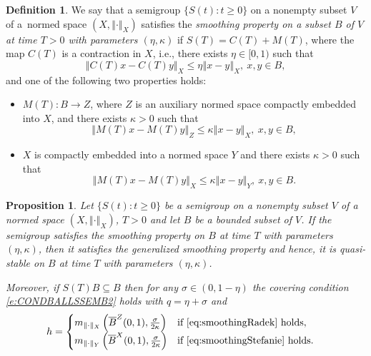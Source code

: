 \documentclass[a4paper,12pt,reqno]{amsart}
\theoremstyle{plain}
\newtheorem{prop}[lem]{Proposition}
\theoremstyle{definition}
\newtheorem{defn}[lem]{Definition}
\numberwithin{equation}{section}
\newcommand{\norm}[1]{\left\Vert#1\right\Vert}
\renewcommand{\geq}{\geqslant}
\renewcommand{\leq}{\leqslant}
\begin{document}
\begin{defn}\label{defn:smooth}
We say that a semigroup $\{S(t)\colon t\geq0\}$ on a nonempty subset $V$ of a~normed space $(X,\norm{\cdot}_{X})$
satisfies the \textit{smoothing property on a subset $B$ of $V$ at time $T>0$ with parameters $(\eta,\kappa)$} if $S(T)=C(T)+M(T)$, where 
the map $C(T)$ is a contraction in $X$, i.e., there exists $\eta\in [0,1)$ such that
\begin{equation}\label{eq:contraction}
\norm{C(T)x-C(T)y}_{X}\leq \eta\norm{x-y}_{X},\ x,y\in B,
\end{equation}
and one of the following two properties holds:
\begin{itemize}
\item[(i)] 
$M(T)\colon B\to Z$, where $Z$ is an auxiliary normed space compactly embedded into $X$, and there exists $\kappa>0$ such that 
\begin{equation}\label{eq:smoothingRadek}
\norm{M(T)x-M(T)y}_{Z}\leq \kappa\norm{x-y}_{X},\ x,y\in B,
\end{equation} 
\item[(ii)] 
$X$ is compactly embedded into a normed space $Y$ and there exists $\kappa>0$  such that 
 \begin{equation}\label{eq:smoothingStefanie}
\norm{M(T)x-M(T)y}_{X}\leq \kappa\norm{x-y}_{Y},\ x,y\in B.
\end{equation} 
\end{itemize}
\end{defn}

\begin{prop}\label{prop:smoothqs}
Let $\{S(t)\colon t\geq 0\}$ be a semigroup on a nonempty subset $V$ of a normed space $(X,\norm{\cdot}_{X})$, $T>0$ 
and let $B$ be a bounded subset of $V$.
If the semigroup satisfies the smoothing property on $B$ at time $T$ with parameters $(\eta,\kappa)$, then it satisfies the generalized smoothing property and hence, it is quasi-stable on $B$ at time $T$ with parameters $(\eta,\kappa)$.

Moreover, if $S(T)B\subseteq B$ then for any $\sigma\in (0,1-\eta)$ the covering condition \eqref{e:CONDBALLSSEMB2} holds with $q=\eta+\sigma$ and
\begin{align*}
h&=
\begin{cases}
m_{\|\cdot\|_X}\left(\overline{B}^Z(0,1),\frac{\sigma}{2\kappa}\right)& \text{if \eqref{eq:smoothingRadek} holds},\\
m_{\|\cdot\|_Y}\left(\overline{B}^X(0,1),\frac{\sigma}{2\kappa}\right)& \text{if \eqref{eq:smoothingStefanie} holds}.
\end{cases}
\end{align*}
\end{prop}
\end{document}
